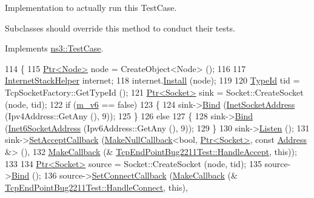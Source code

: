 Implementation to actually run this Test\+Case. 

Subclasses should override this method to conduct their tests. 

Implements \hyperlink{classns3_1_1TestCase_a8ff74680cf017ed42011e4be51917a24}{ns3\+::\+Test\+Case}.


\begin{DoxyCode}
114 \{
115   \hyperlink{classns3_1_1Ptr}{Ptr<Node>} node = CreateObject<Node> ();
116 
117   \hyperlink{classns3_1_1InternetStackHelper}{InternetStackHelper} internet;
118   internet.\hyperlink{classns3_1_1InternetStackHelper_a6645b412f31283d2d9bc3d8a95cebbc0}{Install} (node);
119 
120   \hyperlink{classns3_1_1TypeId}{TypeId} tid = TcpSocketFactory::GetTypeId ();
121   \hyperlink{classns3_1_1Ptr}{Ptr<Socket>} sink = Socket::CreateSocket (node, tid);
122   \textcolor{keywordflow}{if} (\hyperlink{classTcpEndPointBug2211Test_a187eb7cee3ee1550d773cab9bd1ccfc4}{m\_v6} == \textcolor{keyword}{false})
123     \{
124       sink->\hyperlink{classns3_1_1Socket_ada93439a43de2028b5a8fc6621dad482}{Bind} (\hyperlink{classns3_1_1InetSocketAddress}{InetSocketAddress} (Ipv4Address::GetAny (), 9));
125     \}
126   \textcolor{keywordflow}{else}
127     \{
128       sink->\hyperlink{classns3_1_1Socket_ada93439a43de2028b5a8fc6621dad482}{Bind} (\hyperlink{classns3_1_1Inet6SocketAddress}{Inet6SocketAddress} (Ipv6Address::GetAny (), 9));
129     \}
130   sink->\hyperlink{classns3_1_1Socket_a6b3529a32632cf1a56debf5f79e56c54}{Listen} ();
131   sink->\hyperlink{classns3_1_1Socket_a408532e435c63166e6ccc337c0cea871}{SetAcceptCallback} (\hyperlink{group__makenullcallback_ga7e3cd6816f63ea9112c04b0086c2c65a}{MakeNullCallback}<\textcolor{keywordtype}{bool}, 
      \hyperlink{classns3_1_1Ptr}{Ptr<Socket>}, \textcolor{keyword}{const} \hyperlink{classns3_1_1Address}{Address} &> (),
132                            \hyperlink{group__makecallbackmemptr_ga9376283685aa99d204048d6a4b7610a4}{MakeCallback} (&
      \hyperlink{classTcpEndPointBug2211Test_adfcd92c55b5489fa47ff231803b7d940}{TcpEndPointBug2211Test::HandleAccept}, \textcolor{keyword}{this}));
133 
134   \hyperlink{classns3_1_1Ptr}{Ptr<Socket>} source = Socket::CreateSocket (node, tid);
135   source->\hyperlink{classns3_1_1Socket_ada93439a43de2028b5a8fc6621dad482}{Bind} ();
136   source->\hyperlink{classns3_1_1Socket_a18935c615315a1921ea52c1b8c16be7f}{SetConnectCallback} (\hyperlink{group__makecallbackmemptr_ga9376283685aa99d204048d6a4b7610a4}{MakeCallback} (&
      \hyperlink{classTcpEndPointBug2211Test_aeadec4cba94c55bd4e9b47b21652cfb6}{TcpEndPointBug2211Test::HandleConnect}, \textcolor{keyword}{this}),

\end{DoxyCode}
